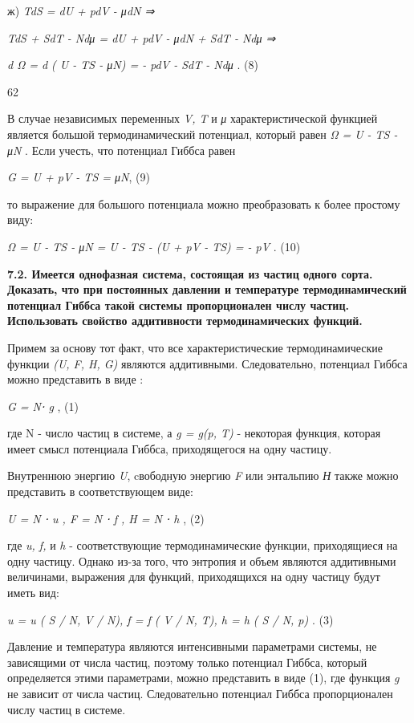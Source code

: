 ж) \emph{TdS = dU + pdV - μdN ⇒}

\emph{TdS + SdT - Ndμ = dU + pdV - μdN + SdT - Ndμ ⇒}

\emph{d Ω = d ( U - TS - μN) = - pdV - SdT - Ndμ} . (8)

62

В случае независимых переменных \emph{V, T} и \emph{μ}
характеристической функцией является большой термодинамический
потенциал, который равен \emph{Ω = U - TS - μN} . Если учесть, что
потенциал Гиббса равен

\emph{G = U + pV - TS = μN}, (9)

то выражение для большого потенциала можно преобразовать к более
простому виду:

\emph{Ω = U - TS - μN = U - TS - (U + pV - TS) = - pV} . (10)

\textbf{7.2. Имеется однофазная система, состоящая из частиц одного
сорта. Доказать, что при постоянных давлении и температуре
термодинамический потенциал Гиббса такой системы пропорционален числу
частиц. Использовать свойство аддитивности термодинамических функций.}

\solving{}

Примем за основу тот факт, что все характеристические термодинамические
функции \emph{(U, F, H, G)} являются аддитивными. Следовательно,
потенциал Гиббса можно представить в виде :

\emph{G = N⋅ g} , (1)

где N - число частиц в системе, а \emph{g = g(p, T)} - некоторая
функция, которая имеет смысл потенциала Гиббса, приходящегося на одну
частицу.

Внутреннюю энергию \emph{U}, cвободную энергию \emph{F} или энтальпию
\emph{Н} также можно представить в соответствующем виде:

\emph{U = N ⋅ u , F = N ⋅ f , H = N ⋅ h} , (2)

где \emph{u, f,} и \emph{h} - соответствующие термодинамические функции,
приходящиеся на одну частицу. Однако из-за того, что энтропия и объем
являются аддитивными величинами, выражения для функций, приходящихся на
одну частицу будут иметь вид:

\emph{u = u ( S / N, V / N), f = f ( V / N, T), h = h ( S / N, p)} . (3)

Давление и температура являются интенсивными параметрами системы, не
зависящими от числа частиц, поэтому только потенциал Гиббса, который
определяется этими параметрами, можно представить в виде (1), где
функция \emph{g} не зависит от числа частиц. Следовательно потенциал
Гиббса пропорционален числу частиц в системе.

